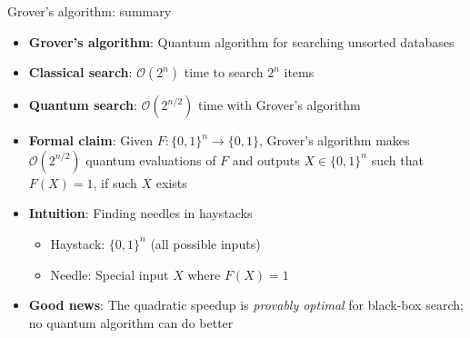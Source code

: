 \ifdefined\PRESENTATION\else\PassOptionsToClass{handout}{beamer}\fi\documentclass[aspectratio=169, lualatex]{beamer}
\begin{document}
\begin{frame}{Grover's algorithm: summary}
	\begin{itemize}
		\item \textbf{Grover's algorithm}: Quantum algorithm for searching unsorted databases
		\item \textbf{Classical search}: $\mathcal{O}(2^n)$ time to search $2^n$ items
		\item \textbf{Quantum search}: $\mathcal{O}(2^{n/2})$ time with Grover's algorithm
		\item \textbf{Formal claim}: Given $F: \{0,1\}^n \rightarrow \{0,1\}$, Grover's algorithm makes $\mathcal{O}(2^{n/2})$ quantum evaluations of $F$ and outputs $X \in \{0,1\}^n$ such that $F(X) = 1$, if such $X$ exists
		\item \textbf{Intuition}: Finding needles in haystacks
		      \begin{itemize}
			      \item Haystack: $\{0,1\}^n$ (all possible inputs)
			      \item Needle: Special input $X$ where $F(X) = 1$
		      \end{itemize}
		\item \textbf{Good news}: The quadratic speedup is \textit{provably optimal} for black-box search; no quantum algorithm can do better
	\end{itemize}
\end{frame}
\end{document}
